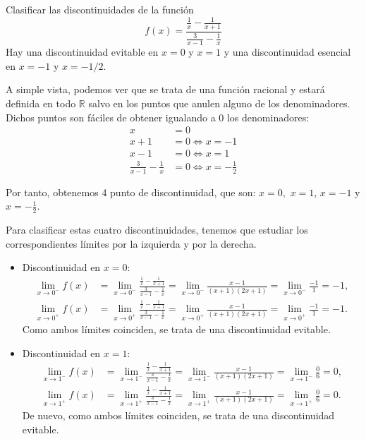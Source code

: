 {Clasificar las discontinuidades de la función
\[
f(x)=\frac{\frac{1}{x}-\frac{1}{x+1}}{\frac{3}{x-1}-\frac{1}{x}}
\]
}
{Hay una discontinuidad evitable en $x=0$ y $x=1$ y una discontinuidad esencial en $x=-1$ y $x=-1/2$.}
{A simple vista, podemos ver que se trata de una función racional y estará definida en todo $\mathbb{R}$ salvo en los puntos que anulen alguno de los denominadores. Dichos puntos son fáciles de obtener igualando a 0 los denominadores:
\begin{align*}
x &= 0 \\
x+1 &= 0\Leftrightarrow x=-1 \\
x-1 &= 0\Leftrightarrow x=1 \\
\frac{3}{x-1}-\frac{1}{x} &= 0\Leftrightarrow x=-\frac{1}{2}
\end{align*}

Por tanto, obtenemos 4 punto de discontinuidad, que son: $x=0,$ $x=1$, $x=-1$ y $x=-\frac{1}{2}$.

Para clasificar estas cuatro discontinuidades, tenemos que estudiar los correspondientes límites por la izquierda y por la derecha.

\begin{itemize}
\item Discontinuidad en $x=0$:
\begin{align*}
\lim_{x\rightarrow 0^{-}}f(x) &= \lim_{x\rightarrow 0^{-}}\frac{\frac{1}{x}-\frac{1}{x+1}}{\frac{3}{x-1}-\frac{1}{x}} = \lim_{x\rightarrow 0^{-}}\frac{x-1}{\left( x+1\right) \left( 2x+1\right) } = \lim_{x\rightarrow 0^{-}}\frac{-1}{1}=-1, \\
\lim_{x\rightarrow 0^{+}}f(x) &= \lim_{x\rightarrow 0^{+}}\frac{\frac{1}{x}-\frac{1}{x+1}}{\frac{3}{x-1}-\frac{1}{x}} = \lim_{x\rightarrow 0^{+}}\frac{x-1}{\left( x+1\right) \left( 2x+1\right) } = \lim_{x\rightarrow 0^{+}}\frac{-1}{1}=-1.
\end{align*}
Como ambos límites coinciden, se trata de una discontinuidad evitable.

\item Discontinuidad en $x=1$:
\begin{align*}
\lim_{x\rightarrow 1^{-}}f(x) &= \lim_{x\rightarrow 1^{-}}\frac{\frac{1}{x}-\frac{1}{x+1}}{\frac{3}{x-1}-\frac{1}{x}} = \lim_{x\rightarrow 1^{-}}\frac{x-1}{\left( x+1\right) \left( 2x+1\right) } = \lim_{x\rightarrow 1^{-}}\frac{0}{6}=0, \\
\lim_{x\rightarrow 1^{+}}f(x) &= \lim_{x\rightarrow 1^{+}}\frac{\frac{1}{x}-\frac{1}{x+1}}{\frac{3}{x-1}-\frac{1}{x}} = \lim_{x\rightarrow 1^{+}}\frac{x-1}{\left( x+1\right) \left( 2x+1\right) } = \lim_{x\rightarrow 1^{+}}\frac{0}{6}=0.
\end{align*}
De nuevo, como ambos límites coinciden, se trata de una discontinuidad evitable.


\end{itemize}}
